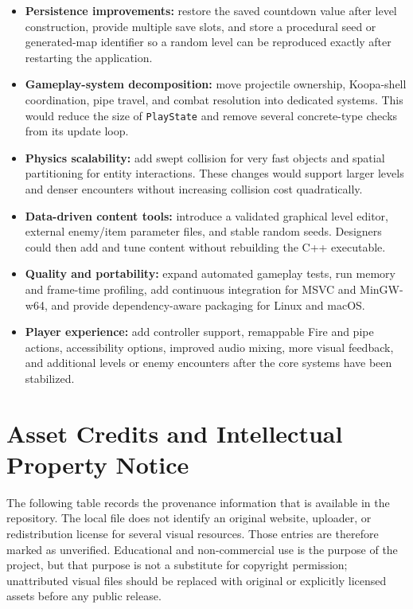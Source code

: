 \documentclass{template}
\begin{document}
\begin{itemize}
    \item \textbf{Persistence improvements:} restore the saved countdown value
          after level construction, provide multiple save slots, and store a
          procedural seed or generated-map identifier so a random level can be
          reproduced exactly after restarting the application.
    \item \textbf{Gameplay-system decomposition:} move projectile ownership,
          Koopa-shell coordination, pipe travel, and combat resolution into
          dedicated systems. This would reduce the size of \texttt{PlayState}
          and remove several concrete-type checks from its update loop.
    \item \textbf{Physics scalability:} add swept collision for very fast
          objects and spatial partitioning for entity interactions. These
          changes would support larger levels and denser encounters without
          increasing collision cost quadratically.
    \item \textbf{Data-driven content tools:} introduce a validated graphical
          level editor, external enemy/item parameter files, and stable random
          seeds. Designers could then add and tune content without rebuilding
          the C++ executable.
    \item \textbf{Quality and portability:} expand automated gameplay tests,
          run memory and frame-time profiling, add continuous integration for
          MSVC and MinGW-w64, and provide dependency-aware packaging for Linux
          and macOS.
    \item \textbf{Player experience:} add controller support, remappable Fire
          and pipe actions, accessibility options, improved audio mixing, more
          visual feedback, and additional levels or enemy encounters after the
          core systems have been stabilized.
\end{itemize}

\section{Asset Credits and Intellectual Property Notice}

The following table records the provenance information that is available in the
repository. The local  file does not identify an
original website, uploader, or redistribution license for several visual
resources. Those entries are therefore marked as unverified. Educational and
non-commercial use is the purpose of the project, but that purpose is not a
substitute for copyright permission; unattributed visual files should be
replaced with original or explicitly licensed assets before any public release.
\end{document}
